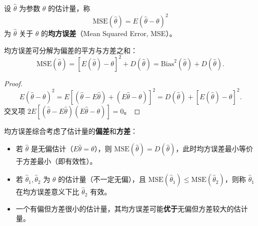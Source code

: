 \documentclass[lang=cn,11pt]{elegantbook}
\begin{document}
\begin{definition}[均方误差] \label{def:mse}
设 \(\hat{\theta}\) 为参数 \(\theta\) 的估计量，称
\[
\mathrm{MSE}(\hat{\theta}) = E(\hat{\theta} - \theta)^2
\]
为 \(\hat{\theta}\) 关于 \(\theta\) 的\textbf{均方误差}（Mean Squared Error, MSE）。
\end{definition}

\begin{property}[均方误差的分解] \label{prop:mse-decomp}
均方误差可分解为偏差的平方与方差之和：
\[
\mathrm{MSE}(\hat{\theta}) = [E(\hat{\theta}) - \theta]^2 + D(\hat{\theta}) = \mathrm{Bias}^2(\hat{\theta}) + D(\hat{\theta}).
\]
\begin{proof}
\[
E(\hat{\theta}-\theta)^2 = E\!\left[(\hat{\theta}-E\hat{\theta})+(E\hat{\theta}-\theta)\right]^2 = D(\hat{\theta}) + [E(\hat{\theta})-\theta]^2.
\]
交叉项 \(2E[(\hat{\theta}-E\hat{\theta})(E\hat{\theta}-\theta)] = 0\)。
\end{proof}
\end{property}

\begin{note}
均方误差综合考虑了估计量的\textbf{偏差}和\textbf{方差}：
\begin{itemize}
    \item 若 \(\hat{\theta}\) 是无偏估计（\(E\hat{\theta}=\theta\)），则 \(\mathrm{MSE}(\hat{\theta}) = D(\hat{\theta})\)，此时均方误差最小等价于方差最小（即有效性）。
    \item 若 \(\hat{\theta}_1, \hat{\theta}_2\) 为 \(\theta\) 的估计量（不一定无偏），且 \(\mathrm{MSE}(\hat{\theta}_1) \leq \mathrm{MSE}(\hat{\theta}_2)\)，则称 \(\hat{\theta}_1\) 在均方误差意义下比 \(\hat{\theta}_2\) 有效。
    \item 一个有偏但方差很小的估计量，其均方误差可能\textbf{优于}无偏但方差较大的估计量。
\end{itemize}
\end{note}
\end{document}
